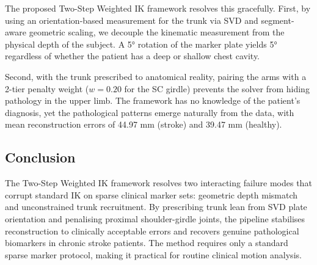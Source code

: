 \documentclass[12pt, a4paper]{elsarticle}
\begin{document}
The proposed Two-Step Weighted IK framework resolves this gracefully. First, by using an orientation-based measurement for the trunk via SVD and segment-aware geometric scaling, we decouple the kinematic measurement from the physical depth of the subject. A 5° rotation of the marker plate yields 5° regardless of whether the patient has a deep or shallow chest cavity. 

Second, with the trunk prescribed to anatomical reality, pairing the arms with a 2-tier penalty weight ($w=0.20$ for the SC girdle) prevents the solver from hiding pathology in the upper limb. The framework has no knowledge of the patient's diagnosis, yet the pathological patterns emerge naturally from the data, with mean reconstruction errors of 44.97 mm (stroke) and 39.47 mm (healthy).

\subsection{Conclusion}
The Two-Step Weighted IK framework resolves two interacting failure modes that corrupt standard IK on sparse clinical marker sets: geometric depth mismatch and unconstrained trunk recruitment. By prescribing trunk lean from SVD plate orientation and penalising proximal shoulder-girdle joints, the pipeline stabilises reconstruction to clinically acceptable errors and recovers genuine pathological biomarkers in chronic stroke patients. The method requires only a standard sparse marker protocol, making it practical for routine clinical motion analysis.
\end{document}
